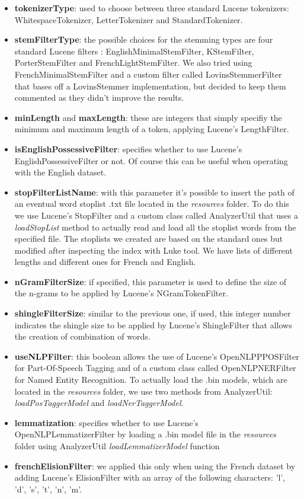 \begin{itemize}
  \item \textbf{tokenizerType}: used to choose between three standard Lucene tokenizers: WhitespaceTokenizer, LetterTokenizer and StandardTokenizer.
  \item \textbf{stemFilterType}: the possible choices for the stemming types are four standard Lucene filters : EnglishMinimalStemFilter, KStemFilter, PorterStemFilter and FrenchLightStemFilter. We also tried using FrenchMinimalStemFilter and a custom filter called LovinsStemmerFilter that bases off a LovinsStemmer implementation, but decided to keep them commented as they didn't improve the results.
  \item \textbf{minLength} and \textbf{maxLength}: these are integers that simply specifiy the minimum and maximum length of a token, applying Lucene's LengthFilter.
  \item \textbf{isEnglishPossessiveFilter}: specifies whether to use Lucene's EnglishPossessiveFilter or not. Of course this can be useful when operating with the English dataset.
  \item \textbf{stopFilterListName}: with this parameter it's possible to insert the path of an eventual word stoplist .txt file located in the \textit{resources} folder. To do this we use Lucene's StopFilter and a custom class called AnalyzerUtil that uses a \textit{loadStopList} method to actually read and load all the stoplist words from the specified file. The stoplists we created are based on the standard ones but modified after inspecting the index with Luke tool. We have lists of different lengths and different ones for French and English.
  \item \textbf{nGramFilterSize}: if specified, this parameter is used to define the size of the n-grams to be applied by Lucene's NGramTokenFilter.
  \item \textbf{shingleFilterSize}: similar to the previous one, if used, this integer number indicates the shingle size to be applied by Lucene's ShingleFilter that allows the creation of combination of words.
  \item \textbf{useNLPFilter}: this boolean allows the use of Lucene's OpenNLPPPOSFilter for Part-Of-Speech Tagging and of a custom class called OpenNLPNERFilter for Named Entity Recognition. To actually load the .bin models, which are located in the \textit{resources} folder, we use two methods from AnalyzerUtil: \textit{loadPosTaggerModel} and \textit{loadNerTaggerModel}.
  \item \textbf{lemmatization}: specifies whether to use Lucene's OpenNLPLemmatizerFilter by loading a .bin model file in the \textit{resources} folder using AnalyzerUtil \textit{loadLemmatizerModel} function
  \item \textbf{frenchElisionFilter}: we applied this only when using the French dataset by adding Lucene's ElisionFilter with an array of the following characters: 'l', 'd', 's', 't', 'n', 'm'.
\end{itemize}
